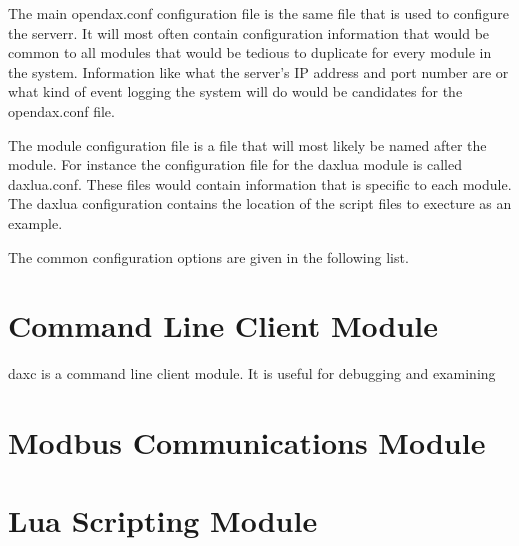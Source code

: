 \documentclass[letterpaper,10pt]{report}
\begin{document}
The main opendax.conf configuration file is the same file that is used to configure the serverr.  It will most often contain configuration information that would be common to all modules that would be tedious to duplicate for every module in the system.  Information like what the server's IP address and port number are or what kind of event logging the system will do would be candidates for the opendax.conf file.

The module configuration file is a file that will most likely be named after the module.  For instance the configuration file for the daxlua module is called daxlua.conf.  These files would contain information that is specific to each module.  The daxlua configuration contains the location of the script files to execture as an example.

The common configuration options are given in the following list.



\chapter*{Command Line Client Module}
daxc is a command line client module.  It is useful for debugging and examining

\chapter*{Modbus Communications Module}

\chapter*{Lua Scripting Module}
\end{document}
